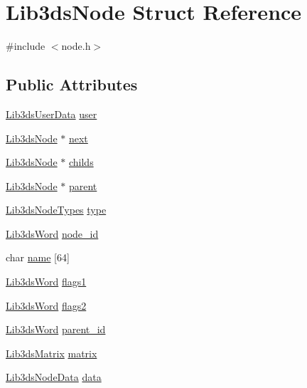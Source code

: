 \hypertarget{struct_lib3ds_node}{\section{Lib3ds\-Node Struct Reference}
\label{struct_lib3ds_node}
}


{\ttfamily \#include $<$node.\-h$>$}

\subsection*{Public Attributes}
\begin{DoxyCompactItemize}
\item 
\hyperlink{union_lib3ds_user_data}{Lib3ds\-User\-Data} \hyperlink{struct_lib3ds_node_a8aa11fb2b2529249bff64354311fafdd}{user}
\item 
\hyperlink{struct_lib3ds_node}{Lib3ds\-Node} $\ast$ \hyperlink{struct_lib3ds_node_a29b3a346b1f5d7ae4e08ddf7f43ddcb2}{next}
\item 
\hyperlink{struct_lib3ds_node}{Lib3ds\-Node} $\ast$ \hyperlink{struct_lib3ds_node_a4ddee45f16c70ea837bb7e0d87917e97}{childs}
\item 
\hyperlink{struct_lib3ds_node}{Lib3ds\-Node} $\ast$ \hyperlink{struct_lib3ds_node_a72cb6b7a1badca5b0505c4cd746fd1e0}{parent}
\item 
\hyperlink{types_8h_aa6e93328c39112c608d845f4e0c56143}{Lib3ds\-Node\-Types} \hyperlink{struct_lib3ds_node_a08e62ff21290f9685c50ad09497fbc7f}{type}
\item 
\hyperlink{types_8h_a439f68d12f4ad080599044949e41dba1}{Lib3ds\-Word} \hyperlink{struct_lib3ds_node_a2661dd2e2140d1bc64294ba97031e59d}{node\-\_\-id}
\item 
char \hyperlink{struct_lib3ds_node_a3a3a3a081a477314778466609db7d436}{name} \mbox{[}64\mbox{]}
\item 
\hyperlink{types_8h_a439f68d12f4ad080599044949e41dba1}{Lib3ds\-Word} \hyperlink{struct_lib3ds_node_ae5a6639389c00fed8158c806d1536dd3}{flags1}
\item 
\hyperlink{types_8h_a439f68d12f4ad080599044949e41dba1}{Lib3ds\-Word} \hyperlink{struct_lib3ds_node_a99fe1027a561faf17cdff4fef1206738}{flags2}
\item 
\hyperlink{types_8h_a439f68d12f4ad080599044949e41dba1}{Lib3ds\-Word} \hyperlink{struct_lib3ds_node_a07f69d490ceedc84793833200f83e344}{parent\-\_\-id}
\item 
\hyperlink{group__matrix_ga6f58ff2ebfcf09ca5b5cda2f3dc1cb74}{Lib3ds\-Matrix} \hyperlink{struct_lib3ds_node_aad674a0fa13ce79328e5917c1c20316a}{matrix}
\item 
\hyperlink{union_lib3ds_node_data}{Lib3ds\-Node\-Data} \hyperlink{struct_lib3ds_node_a41d4f0ca2153d5d663e7a973ff07ed7e}{data}
\end{DoxyCompactItemize}


